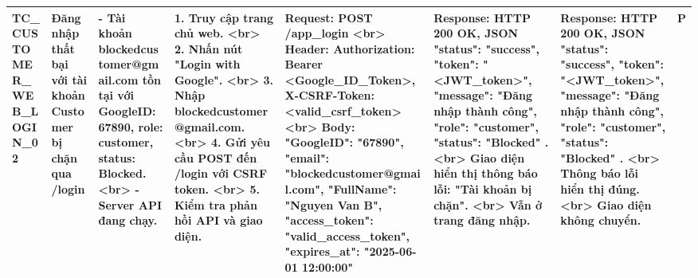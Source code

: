 \documentclass[a4paper,12pt]{article}
\begin{document}
\begin{longtable}{|p{2cm}|p{3cm}|p{3cm}|p{4cm}|p{3cm}|p{3cm}|p{3cm}|p{2cm}|}
    TC_CUSTOMER_WEB_LOGIN_02 & Đăng nhập thất bại với tài khoản Customer bị chặn qua /login & - Tài khoản blockedcustomer@gmail.com tồn tại với GoogleID: 67890, role: customer, status: Blocked. <br> - Server API đang chạy. & 1. Truy cập trang chủ web. <br> 2. Nhấn nút "Login with Google". <br> 3. Nhập blockedcustomer@gmail.com. <br> 4. Gửi yêu cầu POST đến /login với CSRF token. <br> 5. Kiểm tra phản hồi API và giao diện. & Request: POST /app_login <br> Header: Authorization: Bearer <Google_ID_Token>, X-CSRF-Token: <valid_csrf_token> <br> Body: { "GoogleID": "67890", "email": "blockedcustomer@gmail.com", "FullName": "Nguyen Van B", "access_token": "valid_access_token", "expires_at": "2025-06-01 12:00:00" } & Response: HTTP 200 OK, JSON { "status": "success", "token": "<JWT_token>", "message": "Đăng nhập thành công", "role": "customer", "status": "Blocked" }. <br> Giao diện hiển thị thông báo lỗi: "Tài khoản bị chặn". <br> Vẫn ở trang đăng nhập. & Response: HTTP 200 OK, JSON { "status": "success", "token": "<JWT_token>", "message": "Đăng nhập thành công", "role": "customer", "status": "Blocked" }. <br> Thông báo lỗi hiển thị đúng. <br> Giao diện không chuyển. & P \\ \hline
\end{longtable}
\end{document}
